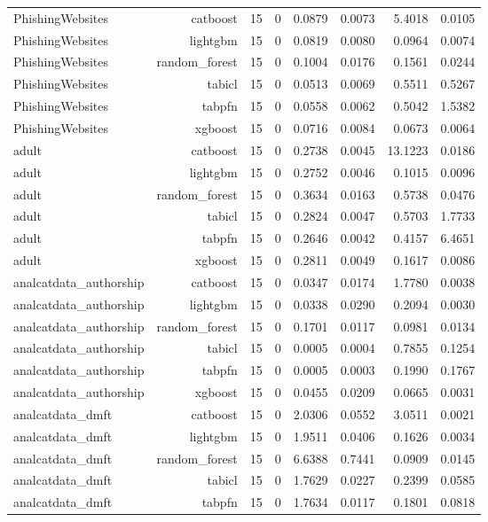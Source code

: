 \begin{table}[htbp]
\begin{tabular}{lrrrrrrr}
PhishingWebsites & catboost & 15 & 0 & 0.0879 & 0.0073 & 5.4018 & 0.0105 \\
PhishingWebsites & lightgbm & 15 & 0 & 0.0819 & 0.0080 & 0.0964 & 0.0074 \\
PhishingWebsites & random\_forest & 15 & 0 & 0.1004 & 0.0176 & 0.1561 & 0.0244 \\
PhishingWebsites & tabicl & 15 & 0 & 0.0513 & 0.0069 & 0.5511 & 0.5267 \\
PhishingWebsites & tabpfn & 15 & 0 & 0.0558 & 0.0062 & 0.5042 & 1.5382 \\
PhishingWebsites & xgboost & 15 & 0 & 0.0716 & 0.0084 & 0.0673 & 0.0064 \\
adult & catboost & 15 & 0 & 0.2738 & 0.0045 & 13.1223 & 0.0186 \\
adult & lightgbm & 15 & 0 & 0.2752 & 0.0046 & 0.1015 & 0.0096 \\
adult & random\_forest & 15 & 0 & 0.3634 & 0.0163 & 0.5738 & 0.0476 \\
adult & tabicl & 15 & 0 & 0.2824 & 0.0047 & 0.5703 & 1.7733 \\
adult & tabpfn & 15 & 0 & 0.2646 & 0.0042 & 0.4157 & 6.4651 \\
adult & xgboost & 15 & 0 & 0.2811 & 0.0049 & 0.1617 & 0.0086 \\
analcatdata\_authorship & catboost & 15 & 0 & 0.0347 & 0.0174 & 1.7780 & 0.0038 \\
analcatdata\_authorship & lightgbm & 15 & 0 & 0.0338 & 0.0290 & 0.2094 & 0.0030 \\
analcatdata\_authorship & random\_forest & 15 & 0 & 0.1701 & 0.0117 & 0.0981 & 0.0134 \\
analcatdata\_authorship & tabicl & 15 & 0 & 0.0005 & 0.0004 & 0.7855 & 0.1254 \\
analcatdata\_authorship & tabpfn & 15 & 0 & 0.0005 & 0.0003 & 0.1990 & 0.1767 \\
analcatdata\_authorship & xgboost & 15 & 0 & 0.0455 & 0.0209 & 0.0665 & 0.0031 \\
analcatdata\_dmft & catboost & 15 & 0 & 2.0306 & 0.0552 & 3.0511 & 0.0021 \\
analcatdata\_dmft & lightgbm & 15 & 0 & 1.9511 & 0.0406 & 0.1626 & 0.0034 \\
analcatdata\_dmft & random\_forest & 15 & 0 & 6.6388 & 0.7441 & 0.0909 & 0.0145 \\
analcatdata\_dmft & tabicl & 15 & 0 & 1.7629 & 0.0227 & 0.2399 & 0.0585 \\
analcatdata\_dmft & tabpfn & 15 & 0 & 1.7634 & 0.0117 & 0.1801 & 0.0818 \\

\end{tabular}
\end{table}
